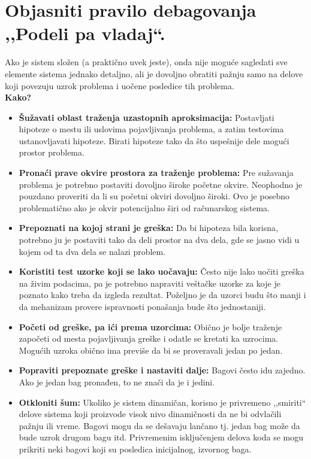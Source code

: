 \documentclass[a4paper]{article}
\begin{document}
\section{Objasniti pravilo debagovanja ,,Podeli pa vladaj``.}
  Ako je sistem složen (a praktično uvek jeste), onda nije moguće sagledati sve elemente sistema
  jednako detaljno, ali je dovoljno obratiti pažnju samo na delove koji povezuju uzrok problema
  i uočene posledice tih problema.\\
  \textbf{Kako?}
  \begin{itemize}
    \item \textbf{Šužavati oblast traženja uzastopnih aproksimacija:} Postavljati hipoteze 
          o mestu ili uslovima pojavljivanja problema, a zatim testovima ustanovljavati hipoteze. 
          Birati hipoteze tako da što uspešnije dele mogući prostor problema.
    \item \textbf{Pronaći prave okvire prostora za traženje problema:} Pre sužavanja problema je 
          potrebno postaviti dovoljno široke početne okvire. Neophodno je pouzdano proveriti da li su
          početni okviri dovoljno široki. Ovo je posebno problematično ako je okvir potencijalno
          širi od računarskog sistema.
    \item \textbf{Prepoznati na kojoj strani je greška:} Da bi hipoteza bila korisna, potrebno ju je
          postaviti tako da deli prostor na dva dela, gde se jasno vidi u kojem od ta dva
          dela se nalazi problem.
    \item \textbf{Koristiti test uzorke koji se lako uočavaju:} Često nije lako uočiti greška na živim
          podacima, pa je potrebno napraviti veštačke uzorke za koje je poznato kako treba
          da izgleda rezultat. Poželjno je da uzorci budu što manji i da mehanizam provere
          ispravnosti ponašanja bude što jednostaniji.
    \item \textbf{Početi od greške, pa ići prema uzorcima:} Obično je bolje traženje započeti od
          mesta pojavljivanja greške i odatle se kretati ka uzrocima. Mogućih uzroka obično
          ima previše da bi se proveravali jedan po jedan.
    \item \textbf{Popraviti prepoznate greške i nastaviti dalje:} Bagovi često idu zajedno. Ako je
          jedan bag pronađen, to ne znači da je i jedini.
    \item \textbf{Otkloniti šum:} Ukoliko je sistem dinamičan, korisno je privremeno ,,smiriti`` delove
          sistema koji proizvode visok nivo dinamičnosti da ne bi odvlačili pažnju ili vreme.
          Bagovi mogu da se dešavaju lančano tj. jedan bag može da bude uzrok drugom bagu itd.
          Privremenim isključenjem delova koda se mogu prikriti neki bagovi koji su posledica
          inicijalnog, izvornog baga.
  \end{itemize}
\end{document}

